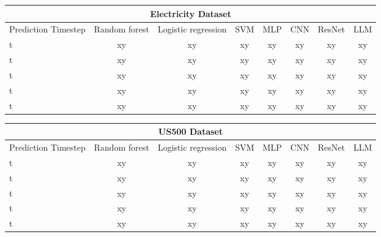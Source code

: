 \begin{center}
	\begin{tabular}{||l || c | c | c | c | c | c | c||}
		\hline
		\multicolumn{8}{|c|}{Electricity Dataset}                                                  \\
		\hline
		Prediction Timestep & Random forest & Logistic regression & SVM & MLP & CNN & ResNet & LLM \\ [0.5ex]
		\hline\hline
		t                   & xy            & xy                  & xy  & xy  & xy  & xy     & xy  \\
		\hline
		t                   & xy            & xy                  & xy  & xy  & xy  & xy     & xy  \\
		\hline
		t                   & xy            & xy                  & xy  & xy  & xy  & xy     & xy  \\
		\hline
		t                   & xy            & xy                  & xy  & xy  & xy  & xy     & xy  \\
		\hline
		t                   & xy            & xy                  & xy  & xy  & xy  & xy     & xy  \\[1ex]
		\hline
	\end{tabular}
\end{center}
\begin{center}
	\begin{tabular}{||l || c | c | c | c | c | c | c||}
		\hline
		\multicolumn{8}{|c|}{US500 Dataset}                                                        \\
		\hline
		Prediction Timestep & Random forest & Logistic regression & SVM & MLP & CNN & ResNet & LLM \\ [0.5ex]
		\hline\hline
		t                   & xy            & xy                  & xy  & xy  & xy  & xy     & xy  \\
		\hline
		t                   & xy            & xy                  & xy  & xy  & xy  & xy     & xy  \\
		\hline
		t                   & xy            & xy                  & xy  & xy  & xy  & xy     & xy  \\
		\hline
		t                   & xy            & xy                  & xy  & xy  & xy  & xy     & xy  \\
		\hline
		t                   & xy            & xy                  & xy  & xy  & xy  & xy     & xy  \\[1ex]
		\hline
	\end{tabular}
\end{center}
